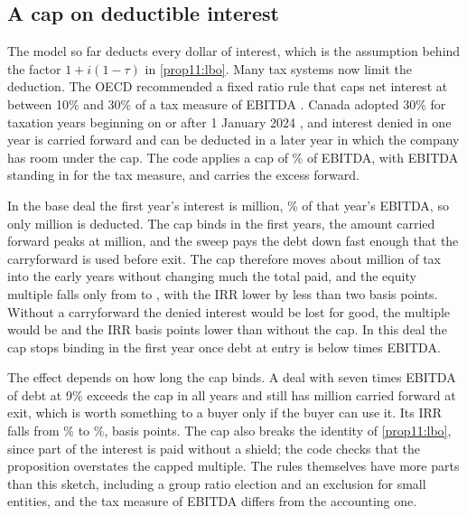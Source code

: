 \begin{chapterrefs}
\subsection{A cap on deductible interest}
\label{sec11:intcap}

The model so far deducts every dollar of interest, which is the assumption behind the factor
$1+i(1-\tau)$ in \cref{prop11:lbo}. Many tax systems now limit the deduction. The OECD recommended a
fixed ratio rule that caps net interest at between 10\% and 30\% of a tax measure of
EBITDA \parencite{oecd2015}. Canada adopted 30\% for taxation years
beginning on or after 1 January 2024 \parencite{ita182}, and interest denied in one year is carried
forward and can be deducted in a later year in which the company has room under the cap. The code
applies a cap of \lxCap\% of EBITDA, with EBITDA standing in for the tax measure, and carries the
excess forward.

In the base deal the first year's interest is \lxCapIntOne{} million, \lxCapIntShareOne\% of that
year's EBITDA, so only \lxCapDedOne{} million is deducted. The cap binds in the first \lxCapBinds{}
years, the amount carried forward peaks at \lxCapCarryPeak{} million, and the sweep pays the debt down
fast enough that the carryforward is used before exit. The cap therefore moves about \lxCapTaxEarly{}
million of tax into the early years without changing much the total paid, and the equity multiple
falls only from \lxMoicThree{} to \lxCapMoic, with the IRR lower by less than two basis points.
Without a carryforward the denied interest would be lost for good, the multiple would be
\lxCapNoCfMoic{} and the IRR \lxCapNoCfIrrDropBp{} basis points lower than without the cap. In this deal the cap
stops binding in the first year once debt at entry is below \lxCapLevFree{} times EBITDA.

The effect depends on how long the cap binds. A deal with seven times EBITDA of debt at 9\% exceeds the
cap in all \lxCapHvBinds{} years and still has \lxCapHvCarry{} million carried forward at exit, which
is worth something to a buyer only if the buyer can use it. Its IRR falls from \lxCapHvIrrNo\% to
\lxCapHvIrr\%, \lxCapHvIrrDropBp{} basis points. The cap also breaks the identity of
\cref{prop11:lbo}, since part of the interest is paid without a shield; the code checks that the
proposition overstates the capped multiple. The rules themselves have more parts than this sketch,
including a group ratio election and an exclusion for small entities, and the tax measure of EBITDA
differs from the accounting one.


\end{chapterrefs}
